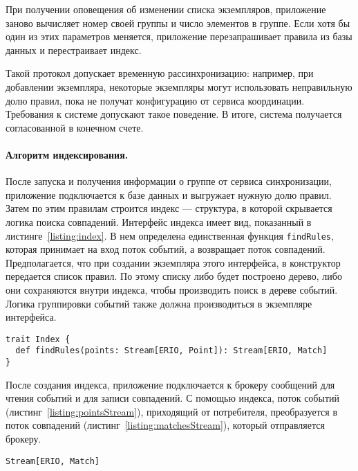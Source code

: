 \documentclass[14pt]{article}
\begin{document}
При получении оповещения об изменении списка экземпляров, приложение заново вычисляет номер своей группы и число элементов в группе. Если хотя бы один из этих параметров меняется, приложение перезапрашивает правила из базы данных и перестраивает индекс.

Такой протокол допускает временную рассинхронизацию: например, при добавлении экземпляра, некоторые экземпляры могут использовать неправильную долю правил, пока не получат конфигурацию от сервиса координации. Требования к системе допускают такое поведение. В итоге, система получается согласованной в конечном счете.

\paragraph{Алгоритм индексирования.} После запуска и получения информации о группе от сервиса синхронизации, приложение подключается к базе данных и выгружает нужную долю правил. Затем по этим правилам строится индекс --- структура, в которой скрывается логика поиска совпадений. Интерфейс индекса имеет вид, показанный в листинге~\ref{listing:index}. В нем определена единственная функция \verb|findRules|, которая принимает на вход поток событий, а возвращает поток совпадений. Предполагается, что при создании экземпляра этого интерфейса, в конструктор передается список правил. По этому списку либо будет построено дерево, либо они сохраняются внутри индекса, чтобы производить поиск в дереве событий. Логика группировки событий также должна производиться в экземпляре интерфейса.

\begin{lstlisting}[style=scalaStyle,caption={Интерфейс, описывающий индекс.},label={listing:index},captionpos=b, float]
trait Index {
  def findRules(points: Stream[ERIO, Point]): Stream[ERIO, Match]
}
\end{lstlisting}

После создания индекса, приложение подключается к брокеру сообщений для чтения событий и для записи совпадений. С помощью индекса, поток событий (листинг~\ref{listing:pointsStream}), приходящий от потребителя, преобразуется в поток совпадений (листинг~\ref{listing:matchesStream}), который отправляется брокеру.

\begin{lstlisting}[style=scalaStyle,caption={Тип, описывающий поток совпадений.},label={listing:matchesStream},captionpos=b, float]
Stream[ERIO, Match]
\end{lstlisting}
\end{document}
